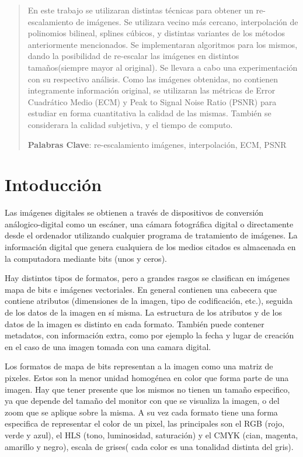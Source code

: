\documentclass[a4paper]{article}
\begin{document}
\setcounter{page}{1}


\begin{abstract}

En este trabajo se utilizaran distintas técnicas para obtener un re-escalamiento de imágenes. Se utilizara vecino más cercano, interpolación de polinomios bilineal, splines cúbicos, y distintas variantes de los métodos anteriormente mencionados. Se implementaran algoritmos para los mismos, dando la posibilidad de re-escalar las imágenes en distintos tamaños(siempre mayor al original). Se llevara a cabo una experimentación con su respectivo análisis. Como las imágenes obtenidas, no contienen integramente información original, se utilizaran las métricas de Error Cuadrático Medio (ECM) y Peak to Signal Noise Ratio (PSNR) para estudiar en forma cuantitativa la calidad de las mismas. También se considerara la calidad subjetiva, y el tiempo de computo. 

\textbf{Palabras Clave}: re-escalamiento imágenes, interpolación, ECM, PSNR

\end{abstract}


\section{Intoducción}

Las imágenes digitales se obtienen a través de dispositivos de conversión análogico-digital como un escáner, una cámara fotográfica digital o directamente desde el ordenador utilizando cualquier programa de tratamiento de imágenes. La información digital que genera cualquiera de los medios citados es almacenada en la computadora mediante bits (unos y ceros). 

Hay distintos tipos de formatos, pero a grandes rasgos se clasifican en imágenes mapa de bits e imágenes vectoriales. En general contienen una cabecera que contiene atributos (dimensiones de la imagen, tipo de codificación, etc.), seguida de los datos de la imagen en sí misma. La estructura de los atributos y de los datos de la imagen es distinto en cada formato. También puede contener metadatos, con información extra, como por ejemplo la fecha y lugar de creación en el caso de una imagen tomada con una camara digital.

Los formatos de mapa de bits representan a la imagen como una matriz de pixeles. Estos son la menor unidad homogénea en color que forma parte de una imagen. Hay que tener presente que los mismos no tienen un tamaño especifico, ya que depende del tamaño del monitor con que se visualiza la imagen, o del zoom que se aplique sobre la misma. A su vez cada formato tiene una forma especifica de representar el color de un pixel, las principales son el RGB (rojo, verde y azul), el HLS (tono, luminosidad, saturación) y el CMYK (cian, magenta, amarillo y negro), escala de grises( cada color es una tonalidad distinta del gris).
\end{document}
